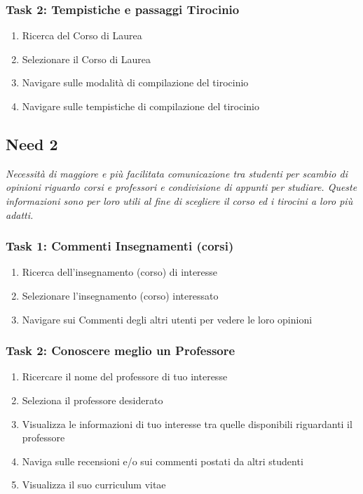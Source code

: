 \subsubsection{Task 2: Tempistiche e passaggi Tirocinio}
\begin{enumerate}
    \item Ricerca del Corso di Laurea
    \item Selezionare il Corso di Laurea
    \item Navigare sulle modalità di compilazione del tirocinio 
    \item Navigare sulle tempistiche di compilazione del tirocinio
\end{enumerate} 

\subsection{Need 2}
\begin{center}
    \textit{Necessità di maggiore e più facilitata comunicazione tra studenti per scambio di opinioni riguardo corsi e professori e condivisione di appunti per studiare. Queste informazioni sono per loro utili al fine di scegliere il corso ed i tirocini a loro più adatti.}
\end{center}
\subsubsection{Task 1: Commenti Insegnamenti (corsi)}
\begin{enumerate}
    \item Ricerca dell'insegnamento (corso) di interesse
    \item Selezionare l'insegnamento (corso) interessato
    \item Navigare sui Commenti degli altri utenti per vedere le loro opinioni
\end{enumerate}

\subsubsection{Task 2: Conoscere meglio un Professore}
\begin{enumerate}
    \item Ricercare il nome del professore di tuo interesse
    \item Seleziona il professore desiderato
    \item Visualizza le informazioni di tuo interesse tra quelle disponibili riguardanti il professore
    \item Naviga sulle recensioni e/o sui commenti postati da altri studenti 
    \item Visualizza il suo curriculum vitae 
\end{enumerate}


